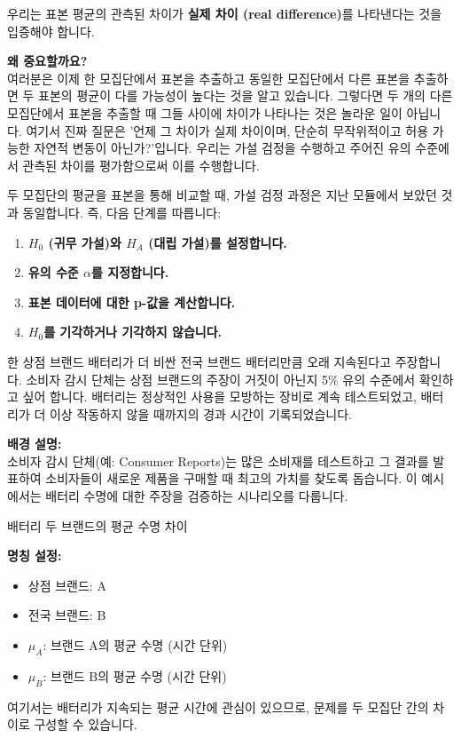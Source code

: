 \documentclass[11pt,a4paper]{article}
\begin{document}
\begin{tcolorbox}[mybox, title=평가 방법: '실제 차이'의 중요성]
우리는 표본 평균의 관측된 차이가 \textbf{실제 차이 (real difference)}를 나타낸다는 것을 입증해야 합니다.

\textbf{왜 중요할까요?} \\
여러분은 이제 한 모집단에서 표본을 추출하고 동일한 모집단에서 다른 표본을 추출하면 두 표본의 평균이 다를 가능성이 높다는 것을 알고 있습니다. 그렇다면 두 개의 다른 모집단에서 표본을 추출할 때 그들 사이에 차이가 나타나는 것은 놀라운 일이 아닙니다. 여기서 진짜 질문은 '언제 그 차이가 실제 차이이며, 단순히 무작위적이고 허용 가능한 자연적 변동이 아닌가?'입니다. 우리는 가설 검정을 수행하고 주어진 유의 수준에서 관측된 차이를 평가함으로써 이를 수행합니다.
\end{tcolorbox}

\begin{tcolorbox}[mybox, title=두 평균에 대한 가설 검정 절차]
두 모집단의 평균을 표본을 통해 비교할 때, 가설 검정 과정은 지난 모듈에서 보았던 것과 동일합니다. 즉, 다음 단계를 따릅니다:
\begin{enumerate}
    \item \textbf{$H_0$ (귀무 가설)와 $H_A$ (대립 가설)를 설정합니다.}
    \item \textbf{유의 수준 $\alpha$를 지정합니다.}
    \item \textbf{표본 데이터에 대한 p-값을 계산합니다.}
    \item \textbf{$H_0$를 기각하거나 기각하지 않습니다.}
\end{enumerate}
\end{tcolorbox}

\begin{examplebox}[title=예시 1: 배터리 수명 비교 - 문제 정의]
한 상점 브랜드 배터리가 더 비싼 전국 브랜드 배터리만큼 오래 지속된다고 주장합니다. 소비자 감시 단체는 상점 브랜드의 주장이 거짓이 아닌지 5\% 유의 수준에서 확인하고 싶어 합니다. 배터리는 정상적인 사용을 모방하는 장비로 계속 테스트되었고, 배터리가 더 이상 작동하지 않을 때까지의 경과 시간이 기록되었습니다.

\textbf{배경 설명:} \\
소비자 감시 단체(예: Consumer Reports)는 많은 소비재를 테스트하고 그 결과를 발표하여 소비자들이 새로운 제품을 구매할 때 최고의 가치를 찾도록 돕습니다. 이 예시에서는 배터리 수명에 대한 주장을 검증하는 시나리오를 다룹니다.
\end{examplebox}

\begin{tcolorbox}[mybox, title=두 브랜드 비교 (1/8): 문제 정의 및 변수 설정]
배터리 두 브랜드의 평균 수명 차이

\textbf{명칭 설정:}
\begin{itemize}
    \item 상점 브랜드: A
    \item 전국 브랜드: B
    \item $\mu_A$: 브랜드 A의 평균 수명 (시간 단위)
    \item $\mu_B$: 브랜드 B의 평균 수명 (시간 단위)
\end{itemize}
여기서는 배터리가 지속되는 평균 시간에 관심이 있으므로, 문제를 두 모집단 간의 차이로 구성할 수 있습니다.
\end{tcolorbox}
\end{document}
